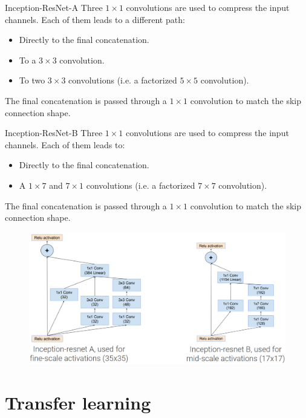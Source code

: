\begin{descriptionlist}
    \item[Inception-ResNet-A] 
        Three $1 \times 1$ convolutions are used to compress the input channels. Each of them leads to a different path:
        \begin{itemize}
            \item Directly to the final concatenation.
            \item To a $3 \times 3$ convolution.
            \item To two $3 \times 3$ convolutions (i.e. a factorized $5 \times 5$ convolution). 
        \end{itemize}
        The final concatenation is passed through a $1 \times 1$ convolution to match the skip connection shape.

    \item[Inception-ResNet-B] 
        Three $1 \times 1$ convolutions are used to compress the input channels. Each of them leads to:
        \begin{itemize}
            \item Directly to the final concatenation.
            \item A $1 \times 7$ and $7 \times 1$ convolutions (i.e. a factorized $7 \times 7$ convolution). 
        \end{itemize}
        The final concatenation is passed through a $1 \times 1$ convolution to match the skip connection shape.
\end{descriptionlist}

\begin{figure}[H]
    \centering
    \includegraphics[width=0.65\linewidth]{./img/inception_resnet.png}
\end{figure}



\section{Transfer learning}

